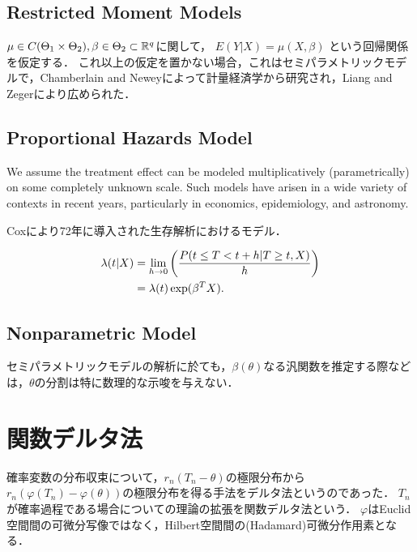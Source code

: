 \documentclass[uplatex,dvipdfmx]{jsreport}
\begin{document}
\subsection{Restricted Moment Models}

$\mu\in C(\Theta_1\times\Theta_2),\beta\in\Theta_2\subset\mathbb{R}^q$に関して，
$E(Y|X)=\mu(X,\beta)$
という回帰関係を仮定する．
これ以上の仮定を置かない場合，これはセミパラメトリックモデルで，Chamberlain and Neweyによって計量経済学から研究され，Liang and Zegerにより広められた．

\subsection{Proportional Hazards Model}

\begin{tcolorbox}[colframe=ForestGreen, colback=ForestGreen!10!white,breakable,colbacktitle=ForestGreen!40!white,coltitle=black,fonttitle=\bfseries\sffamily,
title=]
    We assume the treatment effect can be modeled multiplicatively (parametrically) on some completely unknown scale.
    Such models have arisen in a wide variety of contexts in recent years, particularly in economics, epidemiology, and astronomy.\cite{Bickel}
\end{tcolorbox}

Coxにより72年に導入された生存解析におけるモデル．

\begin{align*}
    \lambda(t|X)&=\lim_{h\to0}\left(\frac{P(t\le T<t+h|T\ge t,X)}{h}\right)\\
    &=\lambda(t)\exp(\beta^TX).
\end{align*}

\subsection{Nonparametric Model}

セミパラメトリックモデルの解析に於ても，$\beta(\theta)$なる汎関数を推定する際などは，$\theta$の分割は特に数理的な示唆を与えない．

\section{関数デルタ法}

\begin{tcolorbox}[colframe=ForestGreen, colback=ForestGreen!10!white,breakable,colbacktitle=ForestGreen!40!white,coltitle=black,fonttitle=\bfseries\sffamily,
title=]
    確率変数の分布収束について，$r_n(T_n-\theta)$の極限分布から$r_n(\varphi(T_n)-\varphi(\theta))$の極限分布を得る手法をデルタ法というのであった．
    $T_n$が確率過程である場合についての理論の拡張を関数デルタ法という．
    $\varphi$はEuclid空間間の可微分写像ではなく，Hilbert空間間の(Hadamard)可微分作用素となる．
\end{tcolorbox}
\end{document}
